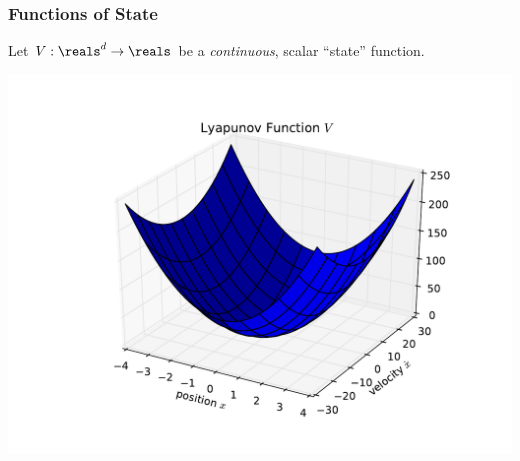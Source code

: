 \documentclass[12pt]{beamer}
\begin{document}
\begin{frame}
\frametitle{Functions of State}

\begin{itemize}
\vitem
Let $V : \reals^d \to \reals$ be a \emph{continuous}, scalar ``state'' function.
\end{itemize}

\begin{center}
\includegraphics[width=.9\linewidth]{pic/smd_V}
\end{center}

\end{frame}
\end{document}
